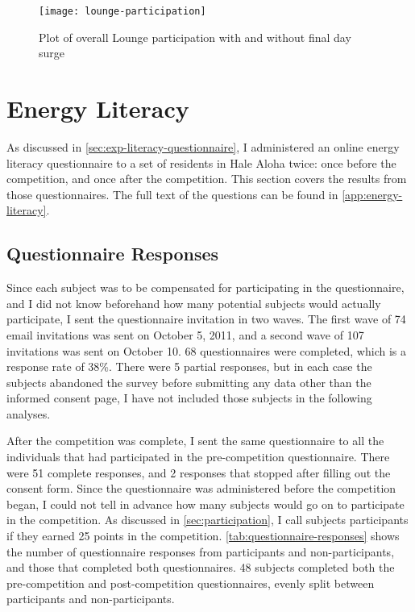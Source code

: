 \begin{figure}[htbp]
	\centering
		\texttt{[image: lounge-participation]}
		\caption{Plot of overall Lounge participation with and without final day surge}
\label{fig:lounge-participation}
\end{figure}


\section{Energy Literacy}

As discussed in \autoref{sec:exp-literacy-questionnaire}, I administered an online energy literacy questionnaire to a set of residents in Hale Aloha twice: once before the competition, and once after the competition. This section covers the results from those questionnaires. The full text of the questions can be found in \autoref{app:energy-literacy}.

\subsection{Questionnaire Responses}

Since each subject was to be compensated for participating in the questionnaire, and I did not know beforehand how many potential subjects would actually participate, I sent the questionnaire invitation in two waves. The first wave of 74 email invitations was sent on October 5, 2011, and a second wave of 107 invitations was sent on October 10. 68 questionnaires were completed, which is a response rate of 38\%. There were 5 partial responses, but in each case the subjects abandoned the survey before submitting any data other than the informed consent page, I have not included those subjects in the following analyses.

After the competition was complete, I sent the same questionnaire to all the individuals that had participated in the pre-competition questionnaire. There were 51 complete responses, and 2 responses that stopped after filling out the consent form. Since the questionnaire was administered before the competition began, I could not tell in advance how many subjects would go on to participate in the competition. As discussed in \autoref{sec:participation}, I call subjects participants if they earned 25 points in the competition. \autoref{tab:questionnaire-responses} shows the number of questionnaire responses from participants and non-participants, and those that completed both questionnaires. 48 subjects completed both the pre-competition and post-competition questionnaires, evenly split between participants and non-participants.

